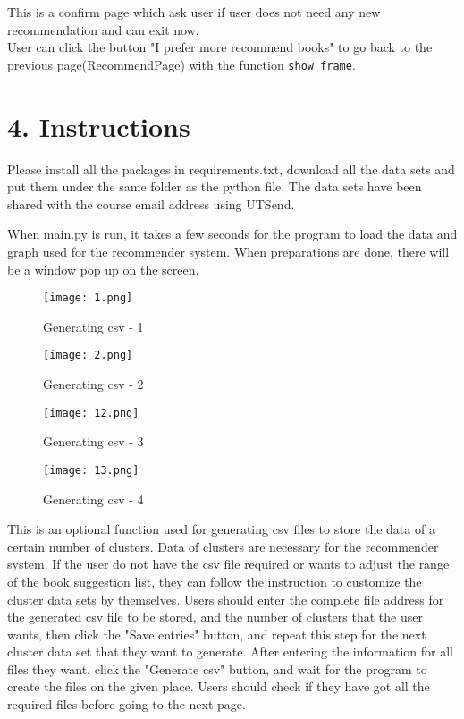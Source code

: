 \documentclass[fontsize=11pt]{article}
\begin{document}
This is a confirm page which ask user if user does not need any new recommendation and can exit now.\\

User can click the button "I prefer more recommend books" to go back to the previous page(RecommendPage) with the function \texttt{show\_frame}.



\section*{4. Instructions }
\qquad Please install all the packages in requirements.txt, download all the data sets and put them under the same folder as the python file. The data sets have been shared with the course email address using UTSend.

\qquad When main.py is run, it takes a few seconds for the program to load the data and graph used for the recommender system. When preparations are done, there will be a window pop up on the screen. 
\begin{figure}[h]
   \begin{minipage}{0.24\textwidth}
     \centering
     \texttt{[image: 1.png]}
     \caption{Generating csv - 1}\label{Fig:Data1}
   \end{minipage}\hfill
   \begin{minipage}{0.24\textwidth}
     \centering
     \texttt{[image: 2.png]}
     \caption{Generating csv - 2}\label{Fig:Data2}
   \end{minipage}
   \begin{minipage}{0.24\textwidth}
     \centering
     \texttt{[image: 12.png]}
     \caption{Generating csv - 3}\label{Fig:Data2}
   \end{minipage}
   \begin{minipage}{0.24\textwidth}
     \centering
     \texttt{[image: 13.png]}
     \caption{Generating csv - 4}\label{Fig:Data2}
   \end{minipage}

\end{figure}

\qquad This is an optional function used for generating csv files to store the data of a certain number of clusters. Data of clusters are necessary for the recommender system. If the user do not have the csv file required or wants to adjust the range of the book suggestion list, they can follow the instruction to customize the cluster data sets by themselves. Users should enter the complete file address for the generated csv file to be stored, and the number of clusters that the user wants, then click the "Save entries" button, and repeat this step for the next cluster data set that they want to generate. After entering the information for all files they want, click the "Generate csv" button, and wait for the program to create the files on the given place. Users should check if they have got all the required files before going to the next page. 
\end{document}
